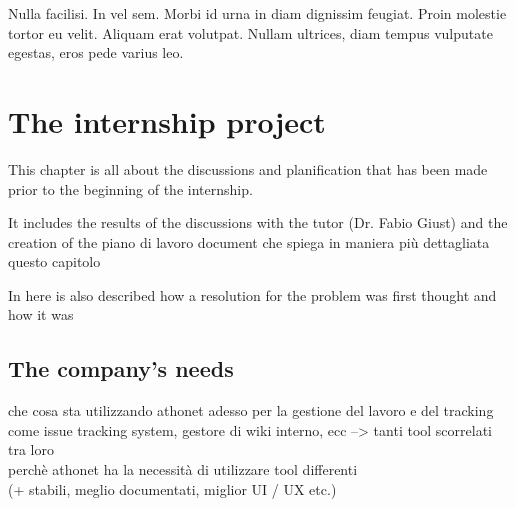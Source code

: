 \begin{savequote}[75mm]
Nulla facilisi. In vel sem. Morbi id urna in diam dignissim feugiat. Proin molestie tortor eu velit. Aliquam erat volutpat. Nullam ultrices, diam tempus vulputate egestas, eros pede varius leo.
\end{savequote}

\chapter{The internship project}



This chapter is all about the discussions and planification that has been made prior to the beginning of the internship.

It includes the results of the discussions with the tutor (Dr. Fabio Giust) and the creation of the piano di lavoro document che spiega in maniera più dettagliata questo capitolo

In here is also described how a resolution for the problem was first thought and how it was 

\section{The company's needs}
che cosa sta utilizzando athonet adesso per la gestione del lavoro e del tracking\\
come issue tracking system, gestore di wiki interno, ecc --> tanti tool scorrelati tra loro\\
perchè athonet ha la necessità di utilizzare tool differenti \\
(+ stabili, meglio documentati, miglior UI / UX etc.)


